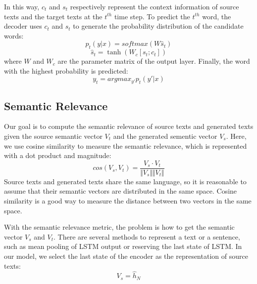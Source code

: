 \documentclass{clv3}
\begin{document}
\begin{CJK*}{UTF8}{gbsn}
In this way, $c_t$ and $s_t$ respectively represent the context information of source texts and the target texts at the $t^{th}$ time step. To predict the $t^{th}$ word, the decoder uses $c_t$ and $s_t$ to generate the probability distribution of the candidate words:
\begin{equation}\label{generator2}
p_t(y|x)=softmax{(W\hat{s}_t)}
\end{equation}
\begin{equation}
\hat{s}_t=\tanh(W_c[s_t;c_t])
\end{equation}
where $W$ and $W_c$ are the parameter matrix of the output layer. Finally, the word with the highest probability is predicted:
\begin{equation}
y_t=argmax_{y'}{p_t(y'|x)}
\end{equation}


\subsection{Semantic Relevance}

Our goal is to compute the semantic relevance of source texts and generated texts given the source semantic vector $V_t$ and the generated sementic vector $V_s$. Here, we use cosine similarity to measure the semantic relevance, which is represented with a dot product and magnitude:
\begin{equation}
cos(V_s,V_t)=\frac{V_{s} \cdot V_{t}}{\Vert V_s \Vert \Vert V_t \Vert}
\end{equation}
Source texts and generated texts share the same language, so it is reasonable to assume that their semantic vectors are distributed in the same space. Cosine similarity is a good way to measure the distance between two vectors in the same space.

With the semantic relevance metric, the problem is how to get the semantic vector $V_s$ and $V_t$. There are several methods to represent a text or a sentence, such as mean pooling of LSTM output or reserving the last state of LSTM. In our model, we select the last state of the encoder as the representation of source texts:
\begin{equation}
V_s=\hat{h}_N
\end{equation}


\end{CJK*}
\end{document}

